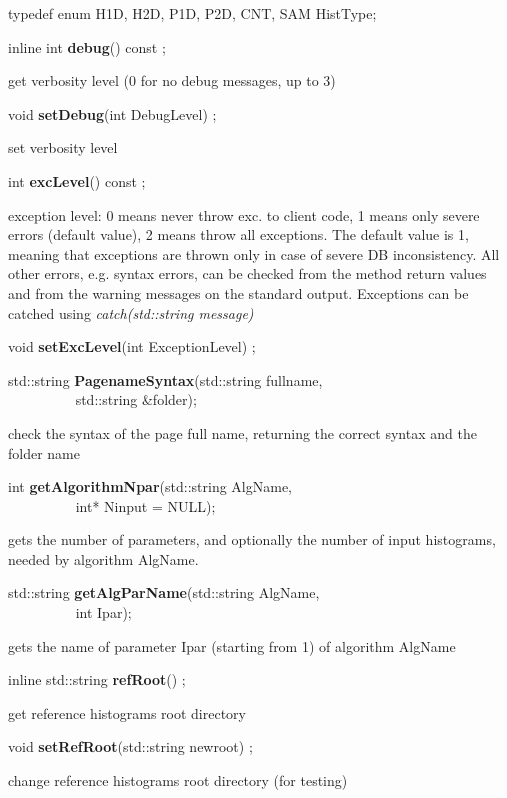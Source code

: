 \item   typedef enum { H1D, H2D, P1D, P2D, CNT, SAM} HistType;
\item    inline int {\bf debug}() const ;

 get verbosity level (0 for no debug messages, up to 3)


\item    void {\bf setDebug}(int DebugLevel) ;

 set verbosity level


\item    int {\bf excLevel}() const ;

 exception level: 0 means never throw exc. to client code, 1 means only
 severe errors (default value), 2 means throw all exceptions.
 The default value is 1, meaning that exceptions are thrown only in
 case of severe DB inconsistency. All other errors, e.g. syntax errors,
 can be checked from the method return values and from the warning
 messages on the standard output.
 Exceptions can be catched using {\it catch(std::string message)}


\item    void {\bf setExcLevel}(int ExceptionLevel) ;




\item    std::string {\bf PagenameSyntax}(std::string fullname,\\\mbox{}~~~~~~~~~ std::string \&folder);


 check the syntax of the page full name, returning the correct syntax and the folder name 


\item    int {\bf getAlgorithmNpar}(std::string AlgName,\\\mbox{}~~~~~~~~~
		       int* Ninput = NULL);

 gets the number of parameters, and optionally the number of input histograms, needed by algorithm AlgName.


\item    std::string {\bf getAlgParName}(std::string AlgName,\\\mbox{}~~~~~~~~~
			    int Ipar);

 gets the name of parameter Ipar (starting from 1) of algorithm AlgName


\item    inline std::string {\bf refRoot}() ;

 get reference histograms root directory 


\item    void {\bf setRefRoot}(std::string newroot) ;

 change reference histograms root directory (for testing)


